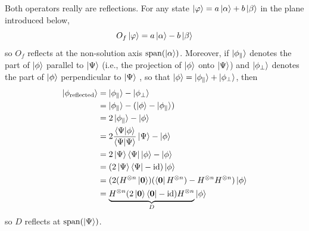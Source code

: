 Both operators really are reflections.
For any state
\(
\ket{\varphi}=a\ket{\alpha}+b\ket{\beta}
\)
in the plane introduced below,
\[
O_f\ket{\varphi}
=
a\ket{\alpha}-b\ket{\beta}
\]
so \(O_f\) reflects at the non-solution axis \(\operatorname{span}(\ket{\alpha})\).
Moreover, 
if
$\ket{\phi_\parallel}$ denotes the part of $\ket{\phi}$ parallel to $\ket{\Psi}$ (i.e., the projection of $\ket{\phi}$ onto $\ket{\Psi}$) and $\ket{\phi_\perp}$ denotes the part of $\ket{\phi}$ perpendicular to $\ket{\Psi}$%
, so that
\(
\ket{\phi}=\ket{\phi_\parallel}+\ket{\phi_\perp}
\),
then
\[
\begin{aligned}
\ket{\phi_{\text{reflected}}}
&=
\ket{\phi_\parallel} - \ket{\phi_\perp} 
\\
&=
\ket{\phi_\parallel} - (\ket{\phi} - \ket{\phi_\parallel})
\\
&=
2\ket{\phi_\parallel} - \ket{\phi}
\\
&=
2\frac{\braket{\Psi|\phi}}{\braket{\Psi|\Psi}}\ket{\Psi} - \ket{\phi}
\\
&=
2\ket{\Psi}\bra{\Psi}\ket{\phi} - \ket{\phi}
\\
&=
(2\ket{\Psi}\bra{\Psi} - \operatorname{id})\ket{\phi}
\\
&=
(2(H^{\otimes n}\ket{{\boldsymbol{0}}})(\bra{{\boldsymbol{0}}}H^{\otimes n})- H^{\otimes n}H^{\otimes n})\ket{\phi}
\\
&=
\underbrace{H^{\otimes n}(2\ket{{\boldsymbol{0}}}\bra{{\boldsymbol{0}}}-\operatorname{id})H^{\otimes n}}_{D}\ket{\phi}
\end{aligned}
\]
so \(D\) reflects at \(\operatorname{span}(\ket{\Psi})\).

